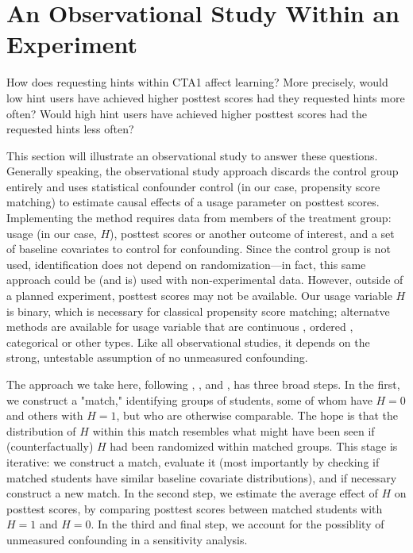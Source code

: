 \documentclass{article}\usepackage[]{graphicx}\usepackage[]{color}
\begin{document}
\section{An Observational Study Within an Experiment}\label{sec:observational}

How does requesting hints within CTA1 affect learning?
More precisely, would low hint users have achieved higher posttest scores
had they requested hints more often?
Would high hint users have achieved higher posttest scores had the
requested hints less often?

This section will illustrate an observational study to answer these
questions.
Generally speaking, the observational study approach discards the
control group entirely and uses statistical confounder control (in our
case, propensity score matching) to estimate causal effects of a usage parameter on posttest scores.
Implementing the method requires data from members of the treatment group: usage (in our case, $H$), posttest scores or another outcome of interest, and a set of baseline covariates to control for confounding.
Since the control group is not used, identification does not depend on randomization---in fact, this same approach could be (and is) used with non-experimental data.
However, outside of a planned experiment, posttest scores may not be available.
Our usage variable $H$ is binary, which is necessary for classical propensity score matching; alternatve methods are available for usage variable that are continuous \citep[e.g.][]{hirano2004propensity}, ordered \citep[e.g.][]{leon2005mixed}, categorical \citep[e.g.][]{lopez2017estimation} or other types.
Like all observational studies, it depends on the strong, untestable assumption of no unmeasured confounding.

The approach we take here, following \citet{rosenbaum2002observational},
 \citet{hansen2009b}, and \citet{ho:etal:2007}, has three broad steps.
In the first, we construct a "match," identifying groups of students, some of whom have $H=0$ and others with $H=1$, but who are otherwise comparable.
The hope is that the distribution of $H$ within this match resembles what might have been seen if (counterfactually) $H$ had been randomized within matched groups.
This stage is iterative: we construct a match, evaluate it (most importantly by checking if matched students have similar baseline covariate distributions), and if necessary construct a new match.
In the second step, we estimate the average effect of $H$ on posttest scores, by comparing posttest scores between matched students with $H=1$ and $H=0$.
In the third and final step, we account for the possiblity of unmeasured confounding in a sensitivity analysis.
\end{document}
